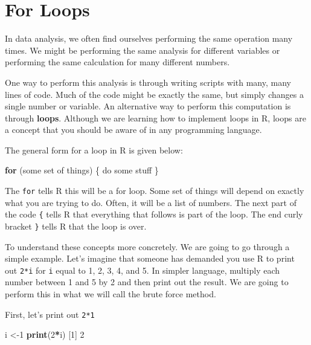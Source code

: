 \documentclass[
]{book}
\newenvironment{Shaded}{\begin{snugshade}}{\end{snugshade}}
\newcommand{\ControlFlowTok}[1]{\textcolor[rgb]{0.13,0.29,0.53}{\textbf{#1}}}
\newcommand{\DecValTok}[1]{\textcolor[rgb]{0.00,0.00,0.81}{#1}}
\newcommand{\FunctionTok}[1]{\textcolor[rgb]{0.13,0.29,0.53}{\textbf{#1}}}
\newcommand{\NormalTok}[1]{#1}
\newcommand{\OtherTok}[1]{\textcolor[rgb]{0.56,0.35,0.01}{#1}}
\newcommand{\SpecialCharTok}[1]{\textcolor[rgb]{0.81,0.36,0.00}{\textbf{#1}}}
\begin{document}
\section{For Loops}\label{for-loops}

In data analysis, we often find ourselves performing the same operation many times. We might be performing the same analysis for different variables or performing the same calculation for many different numbers.

One way to perform this analysis is through writing scripts with many, many lines of code. Much of the code might be exactly the same, but simply changes a single number or variable. An alternative way to perform this computation is through \textbf{loops}. Although we are learning how to implement loops in R, loops are a concept that you should be aware of in any programming language.

The general form for a loop in R is given below:

\begin{Shaded}
\begin{Highlighting}[]
\ControlFlowTok{for}\NormalTok{ (some set of things) \{}
\NormalTok{  do some stuff}
\NormalTok{\}}
\end{Highlighting}
\end{Shaded}

The \texttt{for} tells R this will be a for loop. Some set of things will depend on exactly what you are trying to do. Often, it will be a list of numbers. The next part of the code \texttt{\{} tells R that everything that follows is part of the loop. The end curly bracket \texttt{\}} tells R that the loop is over.

To understand these concepts more concretely. We are going to go through a simple example. Let's imagine that someone has demanded you use R to print out \texttt{2*i} for \texttt{i} equal to 1, 2, 3, 4, and 5. In simpler language, multiply each number between 1 and 5 by 2 and then print out the result. We are going to perform this in what we will call the brute force method.

First, let's print out \texttt{2*1}

\begin{Shaded}
\begin{Highlighting}[]
\NormalTok{i }\OtherTok{\textless{}{-}}\DecValTok{1}
\FunctionTok{print}\NormalTok{(}\DecValTok{2}\SpecialCharTok{*}\NormalTok{i)}
\NormalTok{[}\DecValTok{1}\NormalTok{] }\DecValTok{2}
\end{Highlighting}
\end{Shaded}
\end{document}
